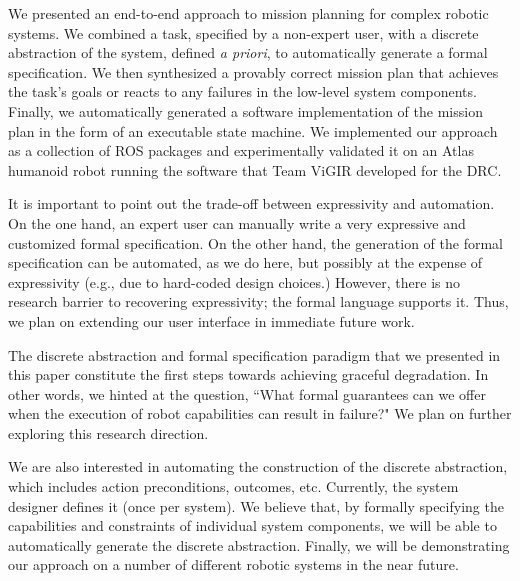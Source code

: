 
We presented an end-to-end approach to mission planning for complex robotic systems.
We combined a task, specified by a non-expert user, with a discrete abstraction of the system, defined \emph{a priori}, to automatically generate a formal specification.
We then synthesized a provably correct mission plan that achieves the task's goals or reacts to any failures in the low-level system components.
Finally, we automatically generated a software implementation of the mission plan in the form of an executable state machine.
We implemented our approach as a collection of ROS packages and experimentally validated it on an Atlas humanoid robot running the software that Team ViGIR developed for the DRC.

It is important to point out the trade-off between expressivity and automation.
On the one hand, an expert user can manually write a very expressive and customized formal specification.
On the other hand, the generation of the formal specification can be automated, as we do here, but possibly at the expense of expressivity (e.g., due to hard-coded design choices.)
However, there is no research barrier to recovering expressivity; the formal language supports it.
Thus, we plan on extending our user interface in immediate future work.

The discrete abstraction and formal specification paradigm that we presented in this paper constitute the first steps towards achieving graceful degradation.
In other words, we hinted at the question, ``What formal guarantees can we offer when the execution of robot capabilities can result in failure?"
We plan on further exploring this research direction.

We are also interested in automating the construction of the discrete abstraction, which includes action preconditions, outcomes, etc.
Currently, the system designer defines it (once per system).
We believe that, by formally specifying the capabilities and constraints of individual system components, we will be able to automatically generate the discrete abstraction.
Finally, we will be demonstrating our approach on a number of different robotic systems in the near future.

